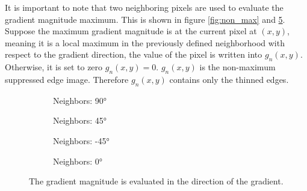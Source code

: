 It is important to note that two neighboring pixels are used to evaluate the gradient magnitude maximum. This is shown in figure \ref{fig:non_max} and \ref{fig:neighbors}.
Suppose the maximum gradient magnitude is at the current pixel at $(x,y)$, meaning it is a local maximum in the previously defined neighborhood with respect to the gradient direction, the value of the pixel is written into $g_n(x,y)$. Otherwise, it is set to zero $g_n(x,y) = 0$. $g_n(x,y)$ is the non-maximum suppressed edge image. Therefore $g_n(x,y)$ contains only the thinned edges.  

\begin{figure}[ht]
    \centering
    \begin{subfigure}[b]{0.23\textwidth}
        \centering
        \caption{Neighbors: 90°}
        \label{fig:n90}
    \end{subfigure}%
    \begin{subfigure}[b]{0.23\textwidth}
        \centering
        \caption{Neighbors: 45°}
        \label{fig:n45}
    \end{subfigure}%
    \begin{subfigure}[b]{0.23\textwidth}
        \centering
        \caption{Neighbors: -45°}
        \label{fig:nn45}
    \end{subfigure}%
    \begin{subfigure}[b]{0.23\textwidth}
        \centering
        \caption{Neighbors: 0°}
        \label{fig:n0}
    \end{subfigure}
    \caption{The gradient magnitude is evaluated in the direction of the gradient.}
    \label{fig:neighbors}
\end{figure}

